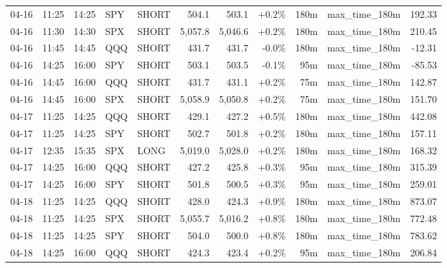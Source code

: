 \documentclass[11pt,a4paper,twoside]{article}
\begin{document}
\begin{center}
\begin{longtable}{>{\color{txtmain}}l l l l l r r r r >{\color{txtmain}}l r}
04-16 & 11:25 & 14:25 & SPY & SHORT & 504.1 & 503.1 & \textcolor{wingreen}{+0.2\%} & 180m & max\_time\_180m & \textcolor{wingreen}{192.33} \\
04-16 & 11:30 & 14:30 & SPX & SHORT & 5,057.8 & 5,046.6 & \textcolor{wingreen}{+0.2\%} & 180m & max\_time\_180m & \textcolor{wingreen}{210.45} \\
04-16 & 11:45 & 14:45 & QQQ & SHORT & 431.7 & 431.7 & \textcolor{lossred}{-0.0\%} & 180m & max\_time\_180m & \textcolor{lossred}{-12.31} \\
04-16 & 14:25 & 16:00 & SPY & SHORT & 503.1 & 503.5 & \textcolor{lossred}{-0.1\%} & 95m & max\_time\_180m & \textcolor{lossred}{-85.53} \\
04-16 & 14:45 & 16:00 & QQQ & SHORT & 431.7 & 431.1 & \textcolor{wingreen}{+0.2\%} & 75m & max\_time\_180m & \textcolor{wingreen}{142.87} \\
04-16 & 14:45 & 16:00 & SPX & SHORT & 5,058.9 & 5,050.8 & \textcolor{wingreen}{+0.2\%} & 75m & max\_time\_180m & \textcolor{wingreen}{151.70} \\
04-17 & 11:25 & 14:25 & QQQ & SHORT & 429.1 & 427.2 & \textcolor{wingreen}{+0.5\%} & 180m & max\_time\_180m & \textcolor{wingreen}{442.08} \\
04-17 & 11:25 & 14:25 & SPY & SHORT & 502.7 & 501.8 & \textcolor{wingreen}{+0.2\%} & 180m & max\_time\_180m & \textcolor{wingreen}{157.11} \\
04-17 & 12:35 & 15:35 & SPX & LONG & 5,019.0 & 5,028.0 & \textcolor{wingreen}{+0.2\%} & 180m & max\_time\_180m & \textcolor{wingreen}{168.32} \\
04-17 & 14:25 & 16:00 & QQQ & SHORT & 427.2 & 425.8 & \textcolor{wingreen}{+0.3\%} & 95m & max\_time\_180m & \textcolor{wingreen}{315.39} \\
04-17 & 14:25 & 16:00 & SPY & SHORT & 501.8 & 500.5 & \textcolor{wingreen}{+0.3\%} & 95m & max\_time\_180m & \textcolor{wingreen}{259.01} \\
04-18 & 11:25 & 14:25 & QQQ & SHORT & 428.0 & 424.3 & \textcolor{wingreen}{+0.9\%} & 180m & max\_time\_180m & \textcolor{wingreen}{873.07} \\
04-18 & 11:25 & 14:25 & SPX & SHORT & 5,055.7 & 5,016.2 & \textcolor{wingreen}{+0.8\%} & 180m & max\_time\_180m & \textcolor{wingreen}{772.48} \\
04-18 & 11:25 & 14:25 & SPY & SHORT & 504.0 & 500.0 & \textcolor{wingreen}{+0.8\%} & 180m & max\_time\_180m & \textcolor{wingreen}{783.62} \\
04-18 & 14:25 & 16:00 & QQQ & SHORT & 424.3 & 423.4 & \textcolor{wingreen}{+0.2\%} & 95m & max\_time\_180m & \textcolor{wingreen}{206.84} \\

\end{longtable}
\end{center}
\end{document}

